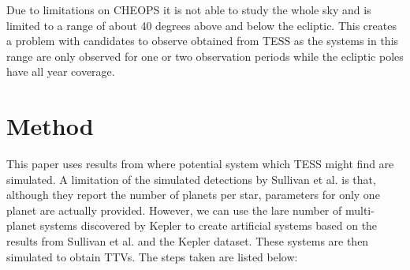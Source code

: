 \documentclass[12pt]{report}
\begin{document}
	Due to limitations on CHEOPS it is not able to study the whole sky and is limited to a range of about 40 degrees above and below the ecliptic. This creates a problem with candidates to observe obtained from TESS as the systems in this range are only observed for one or two observation periods while the ecliptic poles have all year coverage.
	
\chapter{Method}
	This paper uses results from \cite{2015ApJ...809...77S} where potential system which TESS might find are simulated. A limitation of the simulated detections by Sullivan et al. is that, although they report the number of planets per star, parameters for only one planet are actually provided. However, we can use the lare number of multi-planet systems discovered by Kepler to create artificial systems based on the results from Sullivan et al. and the Kepler dataset. These systems are then simulated to obtain TTVs. The steps taken are listed below:
	
\end{document}

